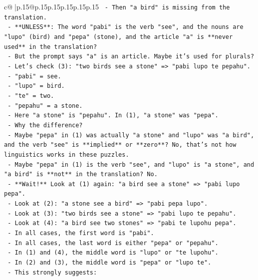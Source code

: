 \documentclass{article}
\begin{document}
{\begin{supertabular}{c@{$\;$}|p{.15\linewidth}@{}p{.15\linewidth}p{.15\linewidth}p{.15\linewidth}p{.15\linewidth}p{.15\linewidth}}
{{{\texttt{          {-} Then "a bird" is missing from the translation.} \\
\texttt{        {-} **UNLESS**: The word "pabi" is the verb "see", and the nouns are "lupo" (bird) and "pepa" (stone), and the article "a" is **never used** in the translation?} \\
\texttt{          {-} But the prompt says "a" is an article. Maybe it's used for plurals?} \\
\texttt{          {-} Let's check (3): "two birds see a stone" => "pabi lupo te pepahu".} \\
\texttt{            {-} "pabi" = see.} \\
\texttt{            {-} "lupo" = bird.} \\
\texttt{            {-} "te" = two.} \\
\texttt{            {-} "pepahu" = a stone.} \\
\texttt{            {-} Here "a stone" is "pepahu". In (1), "a stone" was "pepa".} \\
\texttt{            {-} Why the difference?} \\
\texttt{            {-} Maybe "pepa" in (1) was actually "a stone" and "lupo" was "a bird", and the verb "see" is **implied** or **zero**? No, that's not how linguistics works in these puzzles.} \\
\texttt{            {-} Maybe "pepa" in (1) is the verb "see", and "lupo" is "a stone", and "a bird" is **not** in the translation? No.} \\
\texttt{            {-} **Wait!** Look at (1) again: "a bird see a stone" => "pabi lupo pepa".} \\
\texttt{            {-} Look at (2): "a stone see a bird" => "pabi pepa lupo".} \\
\texttt{            {-} Look at (3): "two birds see a stone" => "pabi lupo te pepahu".} \\
\texttt{            {-} Look at (4): "a bird see two stones" => "pabi te lupohu pepa".} \\
\texttt{            {-} In all cases, the first word is "pabi".} \\
\texttt{            {-} In all cases, the last word is either "pepa" or "pepahu".} \\
\texttt{            {-} In (1) and (4), the middle word is "lupo" or "te lupohu".} \\
\texttt{            {-} In (2) and (3), the middle word is "pepa" or "lupo te".} \\
\texttt{            {-} This strongly suggests:} \\
}}}
\end{supertabular}}
\end{document}
